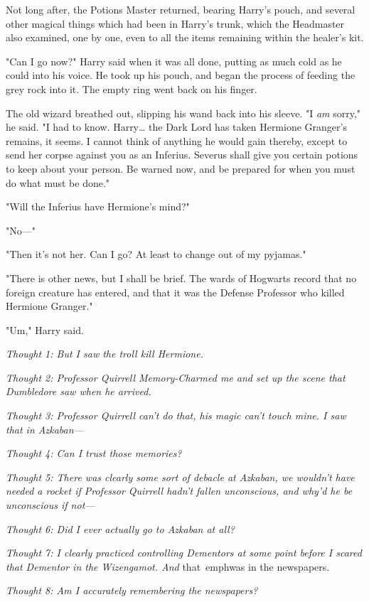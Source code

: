 Not long after, the Potions Master returned, bearing Harry's pouch, and several 
other magical things which had been in Harry's trunk, which the Headmaster also 
examined, one by one, even to all the items remaining within the healer's kit.

"Can I go now?" Harry said when it was all done, putting as much cold as he 
could into his voice. He took up his pouch, and began the process of feeding 
the grey rock into it. The empty ring went back on his finger.

The old wizard breathed out, slipping his wand back into his sleeve. "I 
\emph{am} sorry," he said. "I had to know. Harry{\ldots} the Dark Lord has 
taken Hermione Granger's remains, it seems. I cannot think of anything he would 
gain thereby, except to send her corpse against you as an Inferius. Severus 
shall give you certain potions to keep about your person. Be warned now, and be 
prepared for when you must do what must be done."

"Will the Inferius have Hermione's mind?"

"No---"

"Then it's not her. Can I go? At least to change out of my pyjamas."

"There is other news, but I shall be brief. The wards of Hogwarts record that 
no foreign creature has entered, and that it was the Defense Professor who 
killed Hermione Granger."

"Um," Harry said.

\emph{Thought 1: But I saw the troll kill Hermione.}

\emph{Thought 2: Professor Quirrell Memory-Charmed me and set up the scene that 
Dumbledore saw when he arrived.}

\emph{Thought 3: Professor Quirrell can't do that, his magic can't touch mine. 
I saw that in Azkaban---}

\emph{Thought 4: Can I trust those memories?}

\emph{Thought 5: There was clearly some sort of debacle at Azkaban, we wouldn't 
have needed a rocket if Professor Quirrell hadn't fallen unconscious, and why'd 
he be unconscious if not---}

\emph{Thought 6: Did I ever actually go to Azkaban at all?}

\emph{Thought 7: I clearly practiced controlling Dementors at some point before 
I scared that Dementor in the Wizengamot. And} that\ emph{was in the 
newspapers.}

\emph{Thought 8: Am I accurately remembering the newspapers?}

